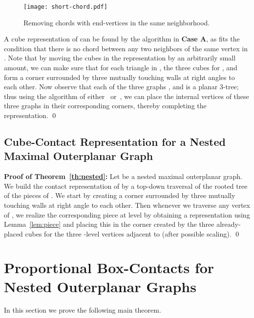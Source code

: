 \documentclass{llncs}
\renewenvironment{proof}{\medskip\noindent{\bf Proof:}}{\mbox{}\hfill\qed\par}
\begin{document}
\begin{proof}
\begin{figure}[t]
\centering
	\texttt{[image: short-chord.pdf]}
	\caption{Removing chords with end-vertices in the same neighborhood.}
	\label{fig:short-chord}
\end{figure}


 A cube representation of  can be found by the algorithm in \textbf{Case A}, as 
 fits the condition that there is no chord between any two neighbors of the same vertex in
 . Note that by moving the cubes in the representation by an arbitrarily
 small amount, we can make sure that for each triangle  in , the three cubes for ,
  and  form a corner surrounded by three mutually touching walls at right angles to
 each other. Now observe that each of the three graphs ,  and  is a planar
 3-tree; thus using the algorithm of either~\cite{BEF+12} or~\cite{FF11}, we can
 place the internal vertices of these three graphs in their corresponding corners, thereby
 completing the representation.
\end{proof}





\subsection{Cube-Contact Representation for a Nested Maximal Outerplanar Graph}


\noindent
\textbf{Proof of Theorem~\ref{th:nested}:} Let  be a nested maximal outerplanar graph.
 We build the contact representation of  by a top-down traversal of the rooted tree
  of the pieces of .
 We start by creating a corner surrounded by three mutually touching walls at right angle
 to each other. Then whenever we traverse any vertex of , we realize the
 corresponding piece  at level  by obtaining a representation using
 Lemma~\ref{lem:piece} and placing  this in the corner created by the three already-placed
 cubes for the three -level vertices adjacent to  (after possible scaling). \qed










\section{Proportional Box-Contacts for Nested Outerplanar Graphs}


In this section we prove the following main theorem.
\end{document}
